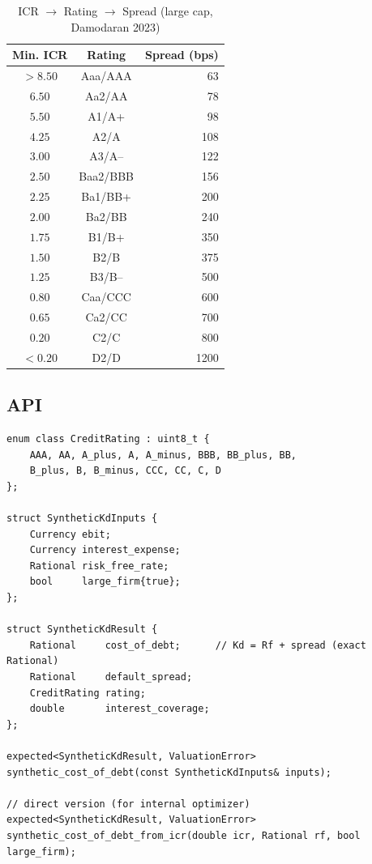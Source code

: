 \documentclass[12pt, a4paper, oneside]{book}
\begin{document}
\begin{table}[h]
\centering
\caption{ICR $\to$ Rating $\to$ Spread (large cap, Damodaran 2023)}
\label{tab:rating}
\begin{tabular}{ccr}
\toprule
\textbf{Min. ICR} & \textbf{Rating} & \textbf{Spread (bps)} \\
\midrule
$> 8.50$ & Aaa/AAA & 63 \\
$6.50$   & Aa2/AA  & 78 \\
$5.50$   & A1/A+   & 98 \\
$4.25$   & A2/A    & 108 \\
$3.00$   & A3/A--  & 122 \\
$2.50$   & Baa2/BBB & 156 \\
$2.25$   & Ba1/BB+ & 200 \\
$2.00$   & Ba2/BB  & 240 \\
$1.75$   & B1/B+   & 350 \\
$1.50$   & B2/B    & 375 \\
$1.25$   & B3/B--  & 500 \\
$0.80$   & Caa/CCC & 600 \\
$0.65$   & Ca2/CC  & 700 \\
$0.20$   & C2/C    & 800 \\
$< 0.20$ & D2/D    & 1200 \\
\bottomrule
\end{tabular}
\end{table}

\subsection{API}

\begin{lstlisting}[style=cpp]
enum class CreditRating : uint8_t {
    AAA, AA, A_plus, A, A_minus, BBB, BB_plus, BB,
    B_plus, B, B_minus, CCC, CC, C, D
};

struct SyntheticKdInputs {
    Currency ebit;
    Currency interest_expense;
    Rational risk_free_rate;
    bool     large_firm{true};
};

struct SyntheticKdResult {
    Rational     cost_of_debt;      // Kd = Rf + spread (exact Rational)
    Rational     default_spread;
    CreditRating rating;
    double       interest_coverage;
};

expected<SyntheticKdResult, ValuationError>
synthetic_cost_of_debt(const SyntheticKdInputs& inputs);

// direct version (for internal optimizer)
expected<SyntheticKdResult, ValuationError>
synthetic_cost_of_debt_from_icr(double icr, Rational rf, bool large_firm);
\end{lstlisting}
\end{document}

